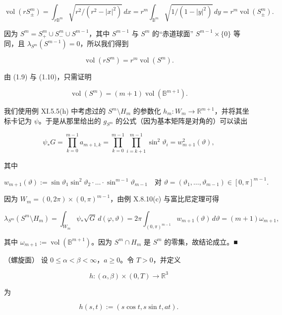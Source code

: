 \begin{example}
\begin{items}
\[
\operatorname{vol}(rS^m_\pm) = \int_{r\mathbb{B}^m} \sqrt{r^2/(r^2 - |x|^2)} \, dx = r^m \int_{\mathbb{B}^m} \sqrt{1/(1 - |y|^2)} \, dy = r^m \operatorname{vol}(S^m_\pm) .
\]

因为 $ S^m = S^m_+ \cup S^m_- \cup S^{m-1} $，其中 $ S^{m-1} $ 与 $ S^m $ 的“赤道球面” $ S^{m-1} \times \{0\} $ 等同，且 $ \lambda_{S^m}(S^{m-1}) = 0 $，所以我们得到

\begin{equation}
\operatorname{vol}(rS^m) = r^m \operatorname{vol}(S^m) .\tag{1.10}
\end{equation}

由 (1.9) 与 (1.10)，只需证明

\[
\operatorname{vol}(S^m) = (m+1)\operatorname{vol}(\mathbb{B}^{m+1}) .
\]

我们使用例 XI.5.5(h) 中考虑过的 $ S^m \setminus H_m $ 的参数化 $ h_m: W_m \to \mathbb{R}^{m+1} $，并将其坐标卡记为 $ \psi $。于是从那里给出的 $ g_{S^m} $ 的公式（因为基本矩阵是对角的）可以读出

\[
\psi_* G = \prod_{k=0}^{m-1} a_{m+1,k} = \prod_{k=0}^{m-1} \prod_{i=k+1}^{m-1} \sin^2 \vartheta_i = w_{m+1}^2(\vartheta) ,
\]

其中

\[
w_{m+1}(\vartheta) := \sin\vartheta_1 \sin^2\vartheta_2 \cdot \ldots \cdot \sin^{m-1}\vartheta_{m-1} \quad \text{对 } \vartheta = (\vartheta_1, \ldots, \vartheta_{m-1}) \in [0, \pi]^{m-1} .
\]

因为 $ W_m = (0, 2\pi) \times (0, \pi)^{m-1} $，由例 X.8.10(c) 与富比尼定理可得

\[
\lambda_{S^m}(S^m \setminus H_m) = \int_{W_m} \psi_*\sqrt{G} \, d(\varphi, \vartheta) = 2\pi \int_{(0, \pi)^{m-1}} w_{m+1}(\vartheta) \, d\vartheta = (m+1)\omega_{m+1} ,
\]

其中 $ \omega_{m+1} := \operatorname{vol}(\mathbb{B}^{m+1}) $。因为 $ S^m \cap H_m $ 是 $ S^m $ 的零集，故结论成立。\nobreak\hspace{0.35em}■

\item

（螺旋面） 设 $ 0 \le \alpha < \beta < \infty $，$ a \ge 0 $。令 $ T > 0 $，并定义

\[
h : (\alpha, \beta) \times (0, T) \to \mathbb{R}^3
\]

为

\[
h(s, t) := (s\cos t, s\sin t, at) .
\]
\end{items}



\end{example}
